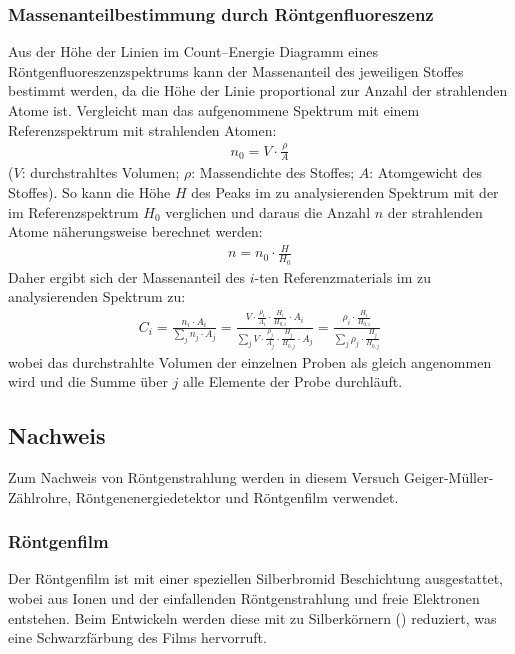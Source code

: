\documentclass[11pt, a4paper]{article}
\begin{document}
\subsubsection{Massenanteilbestimmung durch Röntgenfluoreszenz}
Aus der Höhe der Linien im Count--Energie Diagramm eines Röntgenfluoreszenzspektrums kann der Massenanteil des jeweiligen Stoffes bestimmt werden, da die Höhe der Linie proportional zur Anzahl der strahlenden Atome ist.
Vergleicht man das aufgenommene Spektrum mit einem Referenzspektrum mit strahlenden Atomen:
\begin{align}
  n_0 = V \cdot \frac{\rho}{A}
\end{align}
($V$: durchstrahltes Volumen; $\rho$: Massendichte des Stoffes; $A$: Atomgewicht des Stoffes).
So kann die Höhe $H$ des Peaks im zu analysierenden Spektrum mit der im Referenzspektrum $H_0$ verglichen und daraus die Anzahl $n$ der strahlenden Atome näherungsweise berechnet werden:
\begin{align}
  n = n_0 \cdot \frac{H}{H_0}
\end{align}
Daher ergibt sich der Massenanteil des $i$-ten Referenzmaterials im zu analysierenden Spektrum zu:
\begin{align}
  C_i = \frac{n_i \cdot A_i}{\sum_j n_j \cdot A_j} = \frac{V \cdot \frac{\rho_i}{A_i} \cdot \frac{H_i}{H_{0,i}} \cdot A_i}{\sum_j V \cdot \frac{\rho_j}{A_j} \cdot \frac{H_j}{H_{0,j}}\cdot A_j} = \frac{\rho_i \cdot \frac{H_i}{H_{0,i}}}{\sum_j \rho_j \cdot \frac{H_j}{H_{0,j}}}
  \label{eq:massenanteile}
\end{align}
wobei das durchstrahlte Volumen der einzelnen Proben als gleich angenommen wird und die Summe über $j$ alle Elemente der Probe durchläuft.

\subsection{Nachweis}
\label{sec:nachweis}
Zum Nachweis von Röntgenstrahlung werden in diesem Versuch Geiger-Müller-Zählrohre, Röntgenenergiedetektor und Röntgenfilm verwendet.

\subsubsection{Röntgenfilm}
Der Röntgenfilm ist mit einer speziellen Silberbromid Beschichtung ausgestattet, wobei aus  Ionen und der einfallenden Röntgenstrahlung  und freie Elektronen entstehen.
Beim Entwickeln werden diese mit  zu Silberkörnern () reduziert, was eine Schwarzfärbung des Films hervorruft.
\end{document}
